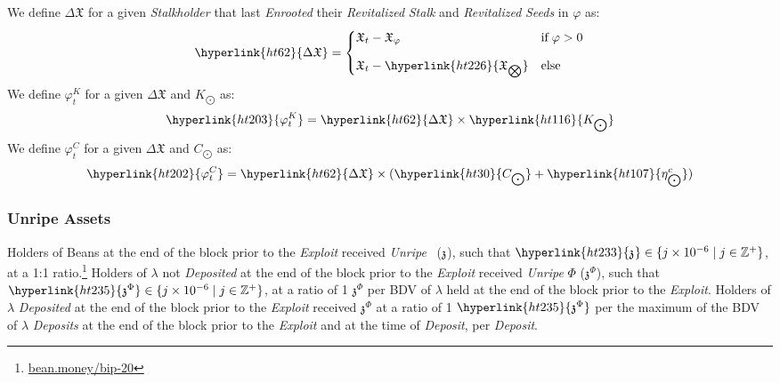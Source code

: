 \documentclass[tikz]{article}
\newcommand{\term}[1]{\textsl{#1}}
\newcommand{\Bean}{} %
\newcommand{\bean}{} %
\begin{document}
We define \hyperlink{ht62}{$\Delta \mathfrak{X}$} for a given \term{Stalkholder} that last \term{Enrooted} their \term{Revitalized} \term{Stalk} and \term{Revitalized} \term{Seeds} in \hyperlink{ht201}{$\varphi$} as:
$$\hyperlink{ht62}{\Delta \mathfrak{X}} = \begin{cases} \mathfrak{X}_{t} - \mathfrak{X}_\varphi & \text{if} \; \varphi > 0 \vspace{.3cm} \\ 
\mathfrak{X}_{t} - \hyperlink{ht226}{\mathfrak{X}_{\bigotimes}} & \text{else}\end{cases}$$
We define \hyperlink{ht203}{${\varphi}_t^K$} for a given \hyperlink{ht62}{$\Delta \mathfrak{X}$} and \hyperlink{ht116}{$K_{\bigodot}$} as:
$$\hyperlink{ht203}{{\varphi}_t^K} = \hyperlink{ht62}{\Delta \mathfrak{X}} \times \hyperlink{ht116}{K_{\bigodot}}$$
We define \hyperlink{ht202}{${\varphi}_t^C$} for a given \hyperlink{ht62}{$\Delta \mathfrak{X}$} and \hyperlink{ht30}{$C_{\bigodot}$} as:
$$\hyperlink{ht202}{{\varphi}_t^C} = \hyperlink{ht62}{\Delta \mathfrak{X}} \times (\hyperlink{ht30}{C_{\bigodot}} + \hyperlink{ht107}{\eta_{\bigodot}^c})$$

\subsubsection{Unripe Assets}
Holders of Beans at the end of the block prior to the \term{Exploit} received \term{Unripe} \Bean\ (\hyperlink{ht229}{$\mathfrak{z}^{\bean}$}), such that $\hyperlink{ht233}{\mathfrak{z}^{\bean}} \in \{j \times 10^{-6} \mid j \in \mathbb{Z}^{+} \}$, at a 1:1 ratio.\footnote{\href{https://bean.money/bip-20}{bean.money/bip-20}} Holders of \hyperlink{ht126}{$\lambda$} not \term{Deposited} at the end of the block prior to the \term{Exploit} received \term{Unripe} \hyperlink{ht187}{$\Phi$} (\hyperlink{ht235}{$\mathfrak{z}^{\Phi}$}), such that $\hyperlink{ht235}{\mathfrak{z}^{\Phi}} \in \{j \times 10^{-6} \mid j \in \mathbb{Z}^{+} \}$, at a ratio of 1 \hyperlink{ht235}{$\mathfrak{z}^{\Phi}$} per BDV of \hyperlink{ht126}{$\lambda$} held at the end of the block prior to the \term{Exploit}. Holders of \hyperlink{ht126}{$\lambda$} \term{Deposited} at the end of the block prior to the \term{Exploit} received \hyperlink{ht235}{$\mathfrak{z}^{\Phi}$} at a ratio of 1 $\hyperlink{ht235}{\mathfrak{z}^{\Phi}}$ per the maximum of the BDV of \hyperlink{ht126}{$\lambda$} \term{Deposits} at the end of the block prior to the \term{Exploit} and at the time of \term{Deposit}, per \term{Deposit}. 
\end{document}

